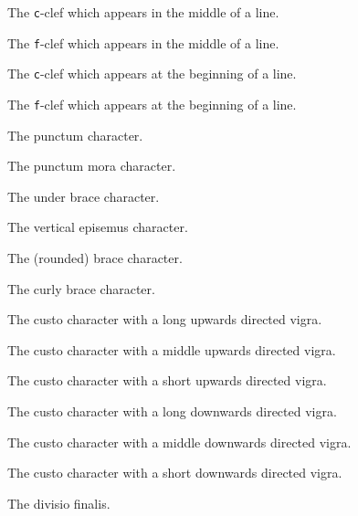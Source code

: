 The \texttt{c}-clef which appears in the middle of a line.

The \texttt{f}-clef which appears in the middle of a line.

The \texttt{c}-clef which appears at the beginning of a line.

The \texttt{f}-clef which appears at the beginning of a line.

The punctum character.

The punctum mora character.

The under brace character.

The vertical episemus character.

The (rounded) brace character.

The curly brace character.

The custo character with a long upwards directed vigra.

The custo character with a middle upwards directed vigra.

The custo character with a short upwards directed vigra.

The custo character with a long downwards directed vigra.

The custo character with a middle downwards directed vigra.

The custo character with a short downwards directed vigra.

The divisio finalis.

